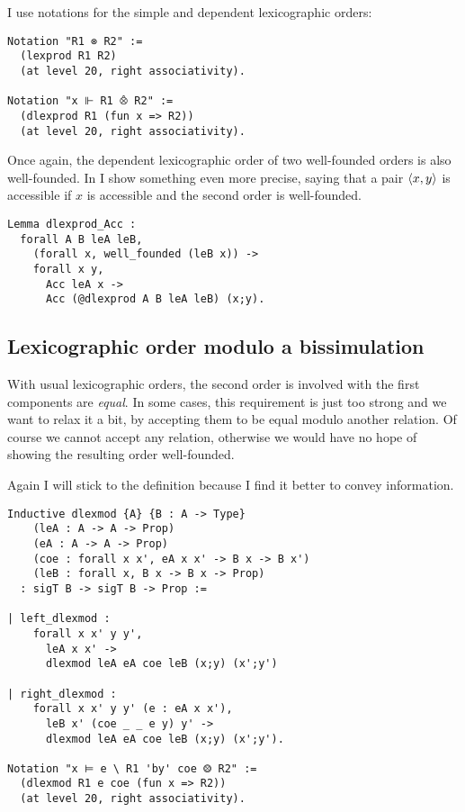 I use notations for the simple and dependent lexicographic orders:
\begin{verbatim}
Notation "R1 ⊗ R2" :=
  (lexprod R1 R2)
  (at level 20, right associativity).

Notation "x ⊩ R1 ⨶ R2" :=
  (dlexprod R1 (fun x => R2))
  (at level 20, right associativity).
\end{verbatim}

Once again, the dependent lexicographic order of two well-founded orders is also
well-founded. In \Coq I show something even more precise, saying that a pair
\(\langle x,y \rangle\) is accessible if \(x\) is accessible and the second order is
well-founded.
\begin{verbatim}
Lemma dlexprod_Acc :
  forall A B leA leB,
    (forall x, well_founded (leB x)) ->
    forall x y,
      Acc leA x ->
      Acc (@dlexprod A B leA leB) (x;y).
\end{verbatim}


\subsection{Lexicographic order modulo a bissimulation}

With usual lexicographic orders, the second order is involved with the first
components are \emph{equal}. In some cases, this requirement is just too strong
and we want to relax it a bit, by accepting them to be equal modulo another
relation. Of course we cannot accept any relation, otherwise we would have no
hope of showing the resulting order well-founded.

Again I will stick to the \Coq definition because I find it better to convey
information.

\begin{verbatim}
Inductive dlexmod {A} {B : A -> Type}
    (leA : A -> A -> Prop)
    (eA : A -> A -> Prop)
    (coe : forall x x', eA x x' -> B x -> B x')
    (leB : forall x, B x -> B x -> Prop)
  : sigT B -> sigT B -> Prop :=

| left_dlexmod :
    forall x x' y y',
      leA x x' ->
      dlexmod leA eA coe leB (x;y) (x';y')

| right_dlexmod :
    forall x x' y y' (e : eA x x'),
      leB x' (coe _ _ e y) y' ->
      dlexmod leA eA coe leB (x;y) (x';y').

Notation "x ⊨ e \ R1 'by' coe ⨷ R2" :=
  (dlexmod R1 e coe (fun x => R2))
  (at level 20, right associativity).
\end{verbatim}

